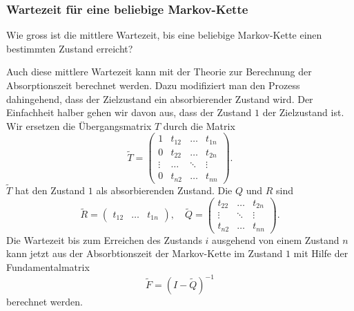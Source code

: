\subsubsection{Wartezeit für eine beliebige Markov-Kette}
%
\begin{frage}
Wie gross ist die mittlere Wartezeit, bis eine beliebige Markov-Kette
einen bestimmten Zustand erreicht?
\end{frage}
Auch diese mittlere Wartezeit kann mit der
Theorie zur Berechnung der Absorptionszeit berechnet werden.
Dazu modifiziert man den Prozess dahingehend, dass der Zielzustand
ein absorbierender Zustand wird.
Der Einfachheit halber gehen wir davon aus, dass der Zustand $1$ 
der Zielzustand ist.
Wir ersetzen die Übergangsmatrix $T$ durch die Matrix
\[
\tilde{T}
=
\left(
\begin{array}{c|ccc}
1     &t_{12}&\dots &t_{1n}\\
\hline
0     &t_{22}&\dots &t_{2n}\\
\vdots&\dots &\ddots&\vdots\\
0     &t_{n2}&\dots &t_{nn}
\end{array}\right).
\]
$\tilde{T}$ hat den Zustand $1$ als absorbierenden Zustand.
Die $Q$ und $R$ sind
\[
\tilde{R}
=
\begin{pmatrix}t_{12}&\dots&t_{1n}\end{pmatrix},
\quad
\tilde{Q}
=
\begin{pmatrix}
t_{22}&\dots &t_{2n}\\
\vdots&\ddots&\vdots\\
t_{n2}&\dots &t_{nn}
\end{pmatrix}.
\]
Die Wartezeit bis zum Erreichen des Zustands $i$ ausgehend von einem
Zustand $n$ kann jetzt aus der Absorbtionszeit der Markov-Kette
im Zustand $1$ mit Hilfe der Fundamentalmatrix
\[
\tilde{F} 
=
(I-\tilde{Q})^{-1}
\]
berechnet werden.


